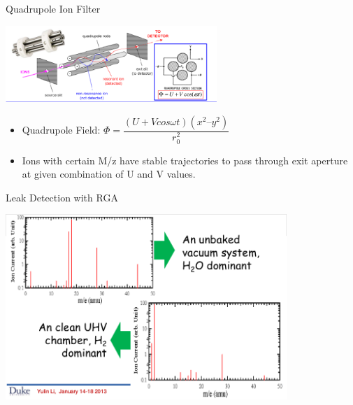 \documentclass[11pt]{beamer}
\begin{document}
\begin{frame}{Quadrupole Ion Filter}

\begin{block}{} 

		\begin{center}
			\includegraphics[width=0.6\textwidth]{QuadrupoleIonFilter.png}
		\end{center} 	


\begin{itemize}
 \item Quadrupole Field: $\Phi=\dfrac{(U + V cos \omega t)(x^{2} – y^{2} )}{r_{0}^{2}}$
 \item Ions with certain M/z have stable trajectories to pass through exit aperture at given combination of U and V values.
\end{itemize}

\end {block}

\end{frame}

\begin{frame}{Leak Detection with RGA}

\begin{block}{} 

		\begin{center}
			\includegraphics[width=0.8\textwidth]{Unbaked.png}
		\end{center} 	



\end {block}

\end{frame}
\end{document}
